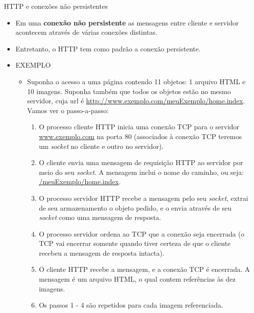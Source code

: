 \documentclass{libs/ufc_format}
\begin{document}
\begin{frame}{HTTP e conexões não persistentes}
    \begin{itemize}
        \justifying
        \item<1> Em uma \textbf{conexão não persistente} as mensagens entre cliente e servidor acontecem através de várias conexões distintas.
        \item<1> Entretanto, o HTTP tem como padrão a conexão persistente.
        \item<2-> EXEMPLO
            \begin{itemize}
                \footnotesize
                \item<2-> Suponha o acesso a uma página contendo 11 objetos: 1 arquivo HTML e 10 imagens. Suponha também que todos os objetos estão no mesmo servidor, cuja url é \url{http://www.exemplo.com/meuExemplo/home.index}. Vamos ver o passo-a-passo:
                \begin{enumerate}
                    \justifying
                    \tiny
                    \item<3-4> O processo cliente HTTP inicia uma conexão TCP para o servidor \url{www.exemplo.com} na porta 80 (associados à conexão TCP teremos um \textit{socket} no cliente e outro no servidor).
                    \item<4-5> O cliente envia uma mensagem de requisição HTTP ao servidor por meio do seu \textit{socket}. A mensagem inclui o nome do caminho, ou seja: \url{/meuExemplo/home.index}.
                    \item<5-6> O processo servidor HTTP recebe a mensagem pelo seu \textit{socket}, extrai de seu armazenamento o objeto pedido, e o envia através de seu \textit{socket} como uma mensagem de resposta.
                    \item<6-7> O processo servidor ordena ao TCP que a conexão seja encerrada (o TCP vai encerrar somente quando tiver certeza de que o cliente recebeu a mensagem de resposta intacta).
                    \item<7-8> O cliente HTTP recebe a mensagem, e a conexão TCP é encerrada. A mensagem é um arquivo HTML, o qual contem referências às dez imagens.
                    \item<8> Os passos 1 - 4 são repetidos para cada imagem referenciada.
                \end{enumerate}
            \end{itemize}
    \end{itemize}
\end{frame}
\end{document}

